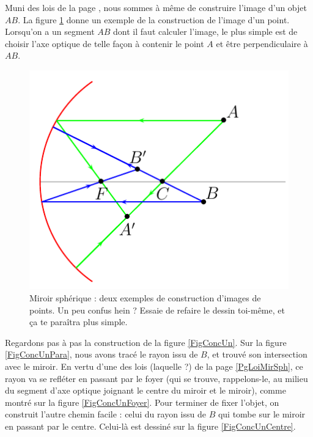 Muni des lois de la page \pageref{PgLoiMirSph}, nous sommes à même de construire l'image d'un objet $AB$. La figure \ref{FigMiroirSpherique} donne un exemple de la construction de l'image d'un point. Lorsqu'on a un segment $AB$ dont il faut calculer l'image, le plus simple est de choisir l'axe optique de telle façon à contenir le point $A$ et être perpendiculaire à $AB$. 

\begin{figure}
\centering
    \includegraphics{fig29073_1.png}
\caption{Miroir sphérique : deux exemples de construction d'images de points. Un peu confus hein ? Essaie de refaire le dessin toi-même, et ça te paraîtra plus simple.}  \label{FigMiroirSpherique}
\end{figure}

Regardons pas à pas la construction de la figure \ref{FigConcUn}. Sur la figure \ref{FigConcUnPara}, nous avons tracé le rayon issu de $B$, et trouvé son intersection avec le miroir. En vertu d'une des lois (laquelle ?) de la page \ref{PgLoiMirSph}, ce rayon va se refléter en passant par le foyer (qui se trouve, rappelons-le, au milieu du segment d'axe optique joignant le centre du miroir et le miroir), comme montré sur la figure \ref{FigConcUnFoyer}. Pour terminer de fixer l'objet, on construit l'autre chemin facile : celui du rayon issu de $B$ qui tombe sur le miroir en passant par le centre. Celui-là est dessiné sur la figure \ref{FigConcUnCentre}.

